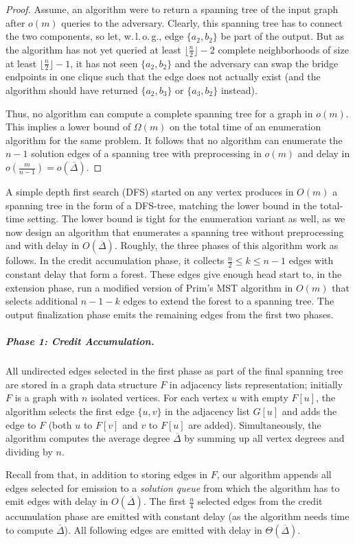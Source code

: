 \documentclass[a4paper, USenglish, cleveref, autoref, thm-restate]{lipics-v2021}
\newcommand{\avgdeg}{\overline{\Delta}}
\begin{document}
\begin{proof}
	Assume, an algorithm were to return a spanning tree of the input graph after $o(m)$ queries to the adversary.
	Clearly, this spanning tree has to connect the two components, so let, w.\,l.\,o.\,g., edge $\{a_2, b_2\}$ be part of the output.
	But as the algorithm has not yet queried at least $\lfloor \frac{n}{2} \rfloor - 2$ complete neighborhoods of size at least $\lfloor \frac{n}{2} \rfloor - 1$, it has not seen $\{a_2, b_2\}$ and the adversary can swap the bridge endpoints in one clique such that the edge does not actually exist (and the algorithm should have returned $\{a_2, b_3\}$ or $\{a_3, b_2\}$ instead).

	Thus, no algorithm can compute a complete spanning tree for a graph in $o(m)$.
	This implies a lower bound of $\Omega(m)$ on the total time of an enumeration algorithm for the same problem.
	It follows that no algorithm can enumerate the $n-1$ solution edges of a spanning tree with preprocessing in $o(m)$ and delay in $o(\frac{m}{n-1}) = o(\avgdeg)$.
\end{proof}

A simple depth first search (DFS) started on any vertex produces in $O(m)$ a spanning tree in the form of a DFS-tree, matching the lower bound in the total-time setting.
The lower bound is tight for the enumeration variant as well, as we now design an algorithm that enumerates a spanning tree without preprocessing and with delay in $O(\avgdeg)$.
Roughly, the three phases of this algorithm work as follows.
In the credit accumulation phase, it collects $\frac{n}{2} \leq k \leq n - 1$ edges with constant delay that form a forest.
These edges give enough head start to, in the extension phase, run a modified version of Prim's MST algorithm in $O(m)$ that selects additional $n - 1 - k$ edges to extend the forest to a spanning tree.
The output finalization phase emits the remaining edges from the first two phases.

\subparagraph*{Phase 1: Credit Accumulation.}
All undirected edges selected in the first phase as part of the final spanning tree are stored in a graph data structure $F$ in adjacency lists representation; initially $F$ is a graph with $n$ isolated vertices.
For each vertex $u$ with empty $F[u]$, the algorithm selects the first edge $\{u,v\}$ in the adjacency list $G[u]$ and adds the edge to $F$ (both $u$ to $F[v]$ and $v$ to $F[u]$ are added).
Simultaneously, the algorithm computes the average degree $\avgdeg$ by summing up all vertex degrees and dividing by $n$.

Recall from  that, in addition to storing edges in $F$, our algorithm appends all edges selected for emission to a \textit{solution queue} from which the algorithm has to emit edges with delay in $O(\avgdeg)$.
The first $\frac{n}{4}$ selected edges from the credit accumulation phase are emitted with constant delay (as the algorithm needs time to compute $\avgdeg$).
All following edges are emitted with delay in $\Theta(\avgdeg)$.
\end{document}
